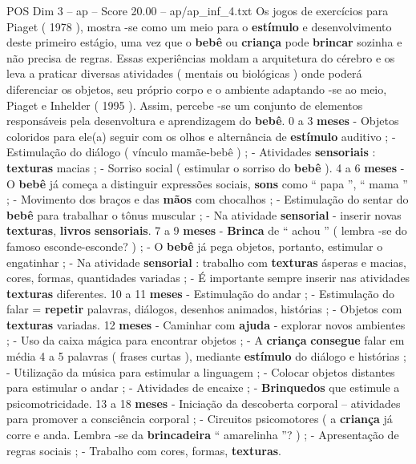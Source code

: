 \begin{textsample}{POS Dim 3 – ap – Score 20.00 – ap/ap\_inf\_4.txt}
Os jogos de exercícios para Piaget ( 1978 ), mostra -se como um meio para o \textbf{estímulo} e desenvolvimento deste primeiro estágio, uma vez que o \textbf{bebê} ou \textbf{criança} pode \textbf{brincar} sozinha e não precisa de regras.
Essas experiências moldam a arquitetura do cérebro e os leva a praticar diversas atividades ( mentais ou biológicas ) onde poderá diferenciar os objetos, seu próprio corpo e o ambiente adaptando -se ao meio, Piaget e Inhelder ( 1995 ).
Assim, percebe -se um conjunto de elementos responsáveis pela desenvoltura e aprendizagem do \textbf{bebê}. 0 a 3 \textbf{meses} - Objetos coloridos para ele(a) seguir com os olhos e alternância de \textbf{estímulo} auditivo ; - Estimulação do diálogo ( vínculo mamãe-bebê ) ; - Atividades \textbf{sensoriais} : \textbf{texturas} macias ; - Sorriso social ( estimular o sorriso do \textbf{bebê} ). 4 a 6 \textbf{meses} - O \textbf{bebê} já começa a distinguir expressões sociais, \textbf{sons} como “ papa ”, “ mama ” ; - Movimento dos braços e das \textbf{mãos} com chocalhos ; - Estimulação do sentar do \textbf{bebê} para trabalhar o tônus muscular ; - Na atividade \textbf{sensorial} - inserir novas \textbf{texturas}, \textbf{livros} \textbf{sensoriais}. 7 a 9 \textbf{meses} - \textbf{Brinca} de “ achou ” ( lembra -se do famoso esconde-esconde? ) ; - O \textbf{bebê} já pega objetos, portanto, estimular o engatinhar ; - Na atividade \textbf{sensorial} : trabalho com \textbf{texturas} ásperas e macias, cores, formas, quantidades variadas ; - É importante sempre inserir nas atividades \textbf{texturas} diferentes. 10 a 11 \textbf{meses} - Estimulação do andar ; - Estimulação do falar = \textbf{repetir} palavras, diálogos, desenhos animados, histórias ; - Objetos com \textbf{texturas} variadas. 12 \textbf{meses} - Caminhar com \textbf{ajuda} - explorar novos ambientes ; - Uso da caixa mágica para encontrar objetos ; - A \textbf{criança} \textbf{consegue} falar em média 4 a 5 palavras ( frases curtas ), mediante \textbf{estímulo} do diálogo e histórias ; - Utilização da música para estimular a linguagem ; - Colocar objetos distantes para estimular o andar ; - Atividades de encaixe ; - \textbf{Brinquedos} que estimule a psicomotricidade. 13 a 18 \textbf{meses} - Iniciação da descoberta corporal – atividades para promover a consciência corporal ; - Circuitos psicomotores ( a \textbf{criança} já corre e anda.
Lembra -se da \textbf{brincadeira} “ amarelinha ”? ) ; - Apresentação de regras sociais ; - Trabalho com cores, formas, \textbf{texturas}.

\end{textsample}
